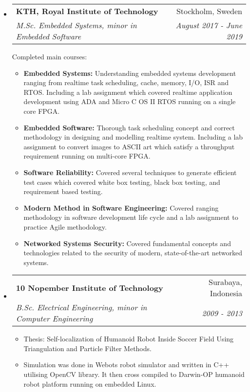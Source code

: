 \documentclass[letterpaper,10pt]{article}
\makeatletter
\newlength{\outerbordwidth}
\newcommand{\resitem}[1]{\item #1 \vspace{-2pt}}
\newcommand{\resheading}[1]{\vspace{8pt}
  \parbox{\textwidth}{\setlength{\FrameSep}{\outerbordwidth}
    \begin{shaded}

\setlength{\fboxsep}{0pt}\framebox[\textwidth][l]{\setlength{\fboxsep}{4pt}\fcolorbox{shadecolorB}{shadecolorB}{\textbf{\sffamily{\mbox{~}\makebox[6.762in][l]{\large #1} \vphantom{p\^{E}}}}}}
    \end{shaded}
  }\vspace{-5pt}
}
\newcommand{\ressubheading}[4]{
\begin{tabular*}{6.5in}{l@{\cftdotfill{\cftsecdotsep}\extracolsep{\fill}}r}
		\textbf{#1} & #2 \\
        \textit{#3} & \textit{#4} \\
\end{tabular*}\vspace{-6pt}}
\newcommand{\ressubheadingwithtext}[4]{
\begin{tabular*}{6.5in}{l@{\cftdotfill{\cftsecdotsep}\extracolsep{\fill}}r}
		\textbf{#1} & #2 \\
        \textit{#3} & \textit{#4} \\
\end{tabular*}\vspace{2pt}}
\newcommand{\ressubheadingtext}[1]{
    \textnormal{#1}\vspace{-6pt}
}
\makeatother
\begin{document}
\begin{itemize}

\item
    \ressubheadingwithtext{KTH, Royal Institute of Technology}{Stockholm, Sweden}{M.Sc. Embedded Systems, minor in Embedded Software}{August 2017 - June 2019}
    \ressubheadingtext{Completed main courses: }
    \begin{itemize}
		\resitem{\textbf{Embedded Systems: }Understanding embedded systems development ranging from realtime task scheduling, cache, memory, I/O, ISR and RTOS. Including a lab assignment which covered realtime application development using ADA and Micro C OS II RTOS running on a single core FPGA.}
        \resitem{\textbf{Embedded Software: }Thorough task scheduling concept and correct methodology in designing and modelling realtime system. Including a lab assignment to convert images to ASCII art which satisfy a throughput requirement running on multi-core FPGA.}
        \resitem{\textbf{Software Reliability: }Covered several techniques to generate efficient test cases which covered white box testing, black box testing, and requirement based testing.}
        \resitem{\textbf{Modern Method in Software Engineering: }Covered ranging methodology in software development life cycle and a lab assignment to practice Agile methodology.}
        \resitem{\textbf{Networked Systems Security: }Covered fundamental concepts and technologies related to the security of modern, state-of-the-art networked systems.}
	\end{itemize} 

\item
	\ressubheading{10 Nopember Institute of Technology}{Surabaya, Indonesia}{B.Sc. Electrical Engineering, minor in Computer Engineering}{2009 - 2013}
	\begin{itemize}
    \resitem{ Thesis: Self-localization of Humanoid Robot Inside Soccer Field Using Triangulation and Particle Filter Methods.}
    \resitem{Simulation was done in Webots robot simulator and written in C++ utilising OpenCV library. It then cross compiled to Darwin-OP humanoid robot platform running on embedded Linux.}
	\end{itemize}

\end{itemize}


\resheading{Skills}

\end{document}
